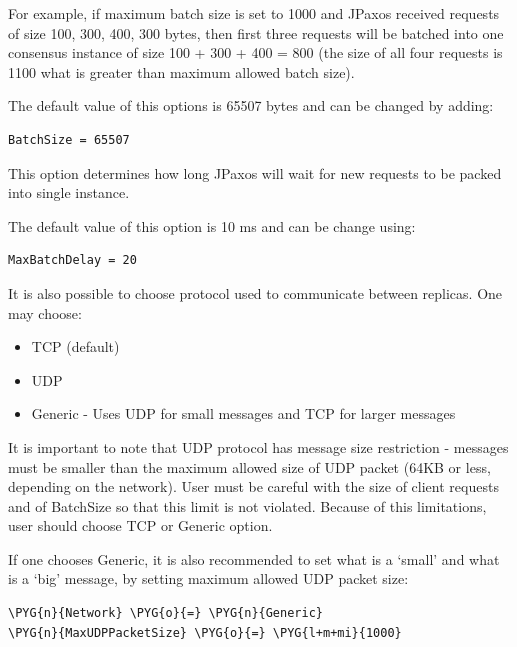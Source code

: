 For example, if maximum batch size is set to 1000 and JPaxos received requests
of size 100, 300, 400, 300 bytes, then first three requests will be batched
into one consensus instance of size 100 + 300 + 400 = 800 (the size of all four
requests is 1100 what is greater than maximum allowed batch size).

The default value of this options is 65507 bytes and can be changed by adding:
\begin{Verbatim}
BatchSize = 65507
\end{Verbatim}


\label{config:maximum-batch-delay}
This option determines how long JPaxos will wait for new requests to be packed
into single instance.

The default value of this option is 10 ms and can be change using:
\begin{Verbatim}
MaxBatchDelay = 20
\end{Verbatim}


\label{config:network-protocol}
It is also possible to choose protocol used to communicate between replicas.
One may choose:
\begin{itemize}
\item {} 
TCP (default)

\item {} 
UDP

\item {} 
Generic - Uses UDP for small messages and TCP for larger messages

\end{itemize}

It is important to note that UDP protocol has message size restriction -
messages must be smaller than the maximum allowed size of UDP packet (64KB or
less, depending on the network). User must be careful with the size of client
requests and of BatchSize so that this limit is not violated. Because of this
limitations, user should choose TCP or Generic option.

If one chooses Generic, it is also recommended to set what is a `small' and
what is a `big' message, by setting maximum allowed UDP packet size:

\begin{Verbatim}[commandchars=\\\{\}]
\PYG{n}{Network} \PYG{o}{=} \PYG{n}{Generic}
\PYG{n}{MaxUDPPacketSize} \PYG{o}{=} \PYG{l+m+mi}{1000}
\end{Verbatim}


